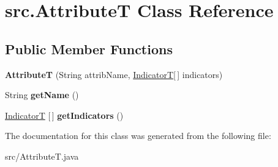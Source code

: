 \hypertarget{classsrc_1_1AttributeT}{}\section{src.\+AttributeT Class Reference}
\label{classsrc_1_1AttributeT}
\subsection*{Public Member Functions}
\begin{DoxyCompactItemize}
\item 
\mbox{\label{classsrc_1_1AttributeT_a137984486b1eb74903cf556d09556a7b}} 
{\bfseries AttributeT} (String attrib\+Name, \hyperlink{enumsrc_1_1IndicatorT}{IndicatorT}\mbox{[}$\,$\mbox{]} indicators)
\item 
\mbox{\label{classsrc_1_1AttributeT_a5fcbd48378d0c08f9630bb44c70f7bb6}} 
String {\bfseries get\+Name} ()
\item 
\mbox{\label{classsrc_1_1AttributeT_a9f206678c126242c6d351a2cd973dc5d}} 
\hyperlink{enumsrc_1_1IndicatorT}{IndicatorT} \mbox{[}$\,$\mbox{]} {\bfseries get\+Indicators} ()
\end{DoxyCompactItemize}


The documentation for this class was generated from the following file\+:\begin{DoxyCompactItemize}
\item 
src/Attribute\+T.\+java\end{DoxyCompactItemize}
